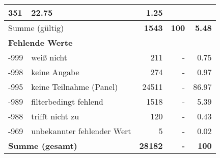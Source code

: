 \begin{longtable}{lXrrr}
       \num{351} &
       \num[round-mode=places,round-precision=2]{22.75} &
         \num[round-mode=places,round-precision=2]{1.25} \\
     \midrule
     \multicolumn{2}{l}{Summe (gültig)} &
       \textbf{\num{1543}} &
     \textbf{\num{100}} &
       \textbf{\num[round-mode=places,round-precision=2]{5.48}} \\
     \multicolumn{5}{l}{\textbf{Fehlende Werte}}\\
       -999 &
       weiß nicht &
         \num{211} &
        - &
         \num[round-mode=places,round-precision=2]{0.75} \\
       -998 &
       keine Angabe &
         \num{274} &
        - &
         \num[round-mode=places,round-precision=2]{0.97} \\
       -995 &
       keine Teilnahme (Panel) &
         \num{24511} &
        - &
         \num[round-mode=places,round-precision=2]{86.97} \\
       -989 &
       filterbedingt fehlend &
         \num{1518} &
        - &
         \num[round-mode=places,round-precision=2]{5.39} \\
       -988 &
       trifft nicht zu &
         \num{120} &
        - &
         \num[round-mode=places,round-precision=2]{0.43} \\
       -969 &
       unbekannter fehlender Wert &
         \num{5} &
        - &
         \num[round-mode=places,round-precision=2]{0.02} \\
     \midrule
     \multicolumn{2}{l}{\textbf{Summe (gesamt)}} &
          \textbf{\num{28182}} &
        \textbf{-} &
        \textbf{\num{100}} \\
     \bottomrule
     \end{longtable}
     

